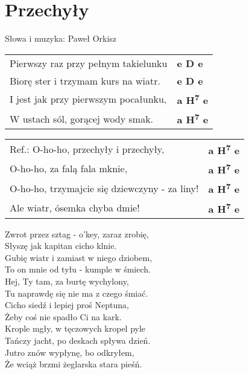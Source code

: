 \section{Przechyły}

Słowa i muzyka: Paweł Orkisz\\

\vspace{2em}
\begin{tabular}{@{}p{9cm}@{}l@{}}
Pierwszy raz przy pełnym takielunku & \bfseries  e D e \\
Biorę ster i trzymam kurs na wiatr. & \bfseries  e D e \\
I jest jak przy pierwszym pocałunku, & \bfseries  a H\textsuperscript{7} e \\
W ustach sól, gorącej wody smak. & \bfseries a H\textsuperscript{7} e \\
\end{tabular}

\vspace{1em}
\begin{tabular}{@{}p{9cm}@{}l@{}}
Ref.: O-ho-ho, przechyły i przechyły, & \bfseries  a H\textsuperscript{7} e \\
O-ho-ho, za falą fala mknie, & \bfseries  a H\textsuperscript{7} e \\
O-ho-ho, trzymajcie się dziewczyny - za liny! & \bfseries  a H\textsuperscript{7} e \\
Ale wiatr, ósemka chyba dmie! & \bfseries  a H\textsuperscript{7} e \\
\end{tabular}

\vspace{1em}
Zwrot przez sztag - o'key, zaraz zrobię, \\
Słyszę jak kapitan cicho klnie. \\
Gubię wiatr i zamiast w niego dziobem, \\
To on mnie od tyłu - kumple w śmiech. \\

Hej, Ty tam, za burtę wychylony, \\
Tu naprawdę się nie ma z czego śmiać. \\
Cicho siedź i lepiej proś Neptuna, \\
Żeby coś nie spadło Ci na kark. \\

Krople mgły, w tęczowych kropel pyle \\
Tańczy jacht, po deskach spływa dzień. \\
Jutro znów wypłynę, bo odkryłem, \\
Że wciąż brzmi żeglarska stara pieśń.